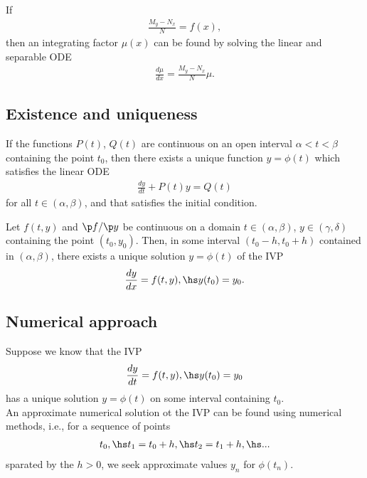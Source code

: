 \documentclass{article}
\begin{document}
\begin{theorem}
    If 
    \begin{align*}
        \frac{M_y-N_x}{N}=f(x),
    \end{align*}
    then an integrating factor $\mu(x)$
    can be found by solving the linear and separable ODE
    \begin{align*}
        \frac{d\mu}{dx}=\frac{M_y-N_x}{N}\mu.
    \end{align*}
\end{theorem}


\subsection{Existence and uniqueness}


\begin{theorem}
    If the functions $P(t)$, $Q(t)$ are continuous on an open interval
    $\alpha<t<\beta$ containing the point $t_0$, then there exists a
    unique function $y=\phi(t)$ which satisfies the linear ODE
    \begin{align*}
        \frac{dy}{dt}+P(t)y=Q(t)
    \end{align*}
    for all $t\in(\alpha,\beta)$, and that satisfies the initial condition.
\end{theorem}

\begin{theorem}
    Let $f(t,y)$ and $\p f/\p y$ be continuous on a domain $t\in(\alpha,\beta)$,
    $y\in(\gamma,\delta)$ containing the point $(t_0, y_0)$. Then, in some
    interval $(t_0-h, t_0+h)$ contained in $(\alpha, \beta)$, there exists
    a unique solution $y=\phi(t)$ of the IVP
    \begin{align*}
        \frac{dy}{dx}=f(t,y),\hs y(t_0) = y_0.
    \end{align*}
\end{theorem}


\subsection{Numerical approach}


\begin{theorem}
    Suppose we know that the IVP
    \begin{align*}
        \frac{dy}{dt} = f(t,y),\hs y(t_0) = y_0
    \end{align*}
    has a unique solution $y=\phi(t)$ on some interval containing $t_0$.\\
    An approximate numerical solution ot the IVP can be found using
    numerical methods, i.e., for a sequence of points
    \begin{align*}
        t_0,\hs t_1=t_0+h,\hs t_2=t_1+h,\hs...
    \end{align*}
    sparated by the  $h>0$, we seek approximate values
    $y_n$ for $\phi(t_n)$.
\end{theorem}
\end{document}
